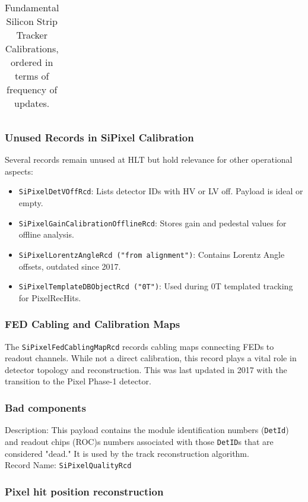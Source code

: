 \begin{table}[h!]
\begin{adjustbox}{max width=\textwidth}
\begin{tabular}{p{2.5cm}|p{5.7cm}|p{1.5cm}|p{2.5cm}|p{3.0cm}}
    \end{tabular}
    \end{adjustbox}
    \caption{Fundamental Silicon Strip Tracker Calibrations, ordered in terms of frequency of updates.}
    \label{tab:PixelCalibrations_critical}
\end{table}

\subsubsection{Unused Records in SiPixel Calibration}
Several records remain unused at HLT but hold relevance for other operational aspects:
\begin{itemize}
    \item \texttt{SiPixelDetVOffRcd}: Lists detector IDs with HV or LV off. Payload is ideal or empty.
    \item \texttt{SiPixelGainCalibrationOfflineRcd}: Stores gain and pedestal values for offline analysis.
    \item \texttt{SiPixelLorentzAngleRcd ("from alignment")}: Contains Lorentz Angle offsets, outdated since 2017.
    \item \texttt{SiPixelTemplateDBObjectRcd ("0T")}: Used during 0T templated tracking for PixelRecHits.
\end{itemize}

\subsubsection{FED Cabling and Calibration Maps}
The \texttt{SiPixelFedCablingMapRcd} records cabling maps connecting FEDs to readout channels. While not a direct calibration, this record plays a vital role in detector topology and reconstruction. This was last updated in 2017 with the transition to the Pixel Phase-1 detector.

\subsubsection{Bad components}
Description: This payload contains the module identification numbers (\texttt{DetId}) and readout chips (ROC)s numbers associated with those \texttt{DetID}s that are considered "dead." It is used by the track reconstruction algorithm.\\
Record Name: \texttt{SiPixelQualityRcd} 

\subsubsection{Pixel hit position reconstruction}

